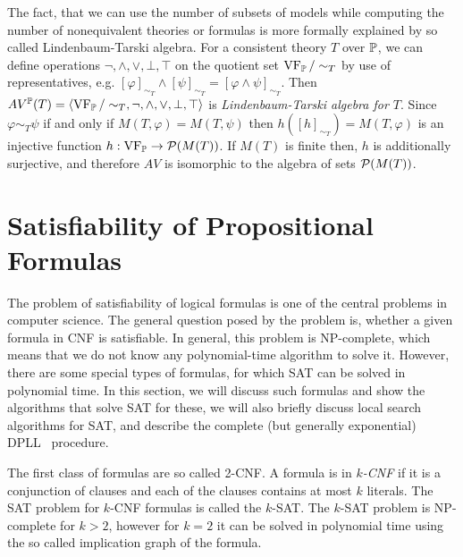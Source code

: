 The fact, that we can use the number of subsets of models while computing the number of nonequivalent theories or formulas is more formally explained by so called Lindenbaum-Tarski algebra. For a consistent theory $T$ over $\mathbb{P}$, we can define operations $\neg, \land, \lor, \bot, \top$ on the quotient set $\operatorname{VF}_\mathbb{P}/\sim_T$ by use of representatives, e.g. $[\varphi]_{\sim_T} \land [\psi]_{\sim_T} = [\varphi \land \psi]_{\sim_T}$. Then $AV^\mathbb{P}(T) = \langle \operatorname{VF}_\mathbb{P}/\sim_T, \neg, \land, \lor, \bot, \top \rangle$ is \emph{Lindenbaum-Tarski algebra for $T$}. Since $\varphi \sim_T \psi$ if and only if $M(T, \varphi) = M(T, \psi)$ then $h([h]_{\sim_T}) = M(T, \varphi)$ is an injective function $h: \operatorname{VF}_\mathbb{P} \to \mathcal{P}(M(T))$. If $M(T)$ is finite then, $h$ is additionally surjective, and therefore $AV$ is isomorphic to the algebra of sets $\mathcal{P}(M(T))$.


\section{Satisfiability of Propositional Formulas}

The problem of satisfiability of logical formulas is one of the central problems in computer science. The general question posed by the problem is, whether a given formula in CNF is satisfiable. In general, this problem is NP-complete, which means that we do not know any polynomial-time algorithm to solve it. However, there are some special types of formulas, for which SAT can be solved in polynomial time. In this section, we will discuss such formulas and show the algorithms that solve SAT for these, we will also briefly discuss local search algorithms for SAT, and describe the complete (but generally exponential) DPLL~ procedure.

The first class of formulas are so called 2-CNF. A formula is in \emph{$k$-CNF} if it is a conjunction of clauses and each of the clauses contains at most $k$ literals. The SAT problem for $k$-CNF formulas is called the $k$-SAT. The $k$-SAT problem is NP-complete for $k>2$, however for $k=2$ it can be solved in polynomial time using the so called implication graph of the formula. 

